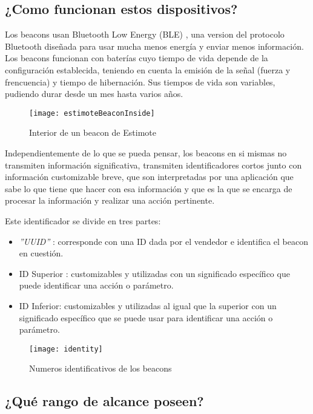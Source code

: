 \subsection{¿Como funcionan estos dispositivos?}

Los beacons usan Bluetooth Low Energy (BLE) \cite{URL::BluetoothLowEnergy}, una version del protocolo Bluetooth diseñada para usar mucha menos energía y enviar menos información. Los beacons funcionan con baterías cuyo tiempo de vida depende de la configuración establecida, teniendo en cuenta la emisión de la señal (fuerza y frencuencia) y tiempo de hibernación. Sus tiempos de vida son variables, pudiendo durar desde un mes hasta varios años. 

\begin{figure}[h]
	\centering
	\texttt{[image: estimoteBeaconInside]}
	\caption{Interior de un beacon de Estimote}
	\label{fig:beaconInside}
\end{figure}

Independientemente de lo que se pueda pensar, los beacons en si mismas no transmiten información significativa, transmiten identificadores cortos junto con información customizable breve, que son interpretadas por una aplicación que sabe lo que tiene que hacer con esa información y que es la que se encarga de procesar la información y realizar una acción pertinente.

Este identificador se divide en tres partes: 

\begin{itemize}
\item \textit{''UUID''} \cite{URL::UUID} : corresponde con una ID dada por el vendedor e identifica el beacon en cuestión.
\item ID Superior : customizables y utilizadas con un significado específico que puede identificar una acción o parámetro. 
\item ID Inferior: customizables y utilizadas al igual que la superior con un significado específico que se puede usar para identificar una acción o parámetro.
\end{itemize}

\begin{figure}[h]
	\centering
	\texttt{[image: identity]}
	\caption{Numeros identificativos de los beacons}
	\label{fig:beaconId}
\end{figure}

\subsection{¿Qué rango de alcance poseen?}

